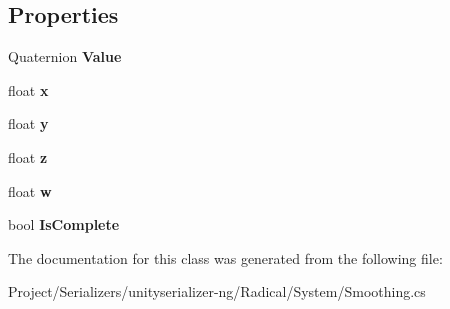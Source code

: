 \subsection*{Properties}
\begin{DoxyCompactItemize}
\item 
\mbox{\label{class_radical_library_1_1_smooth_quaternion_a9d3f043e67591ab5f423382e4c80e31a}} 
Quaternion {\bfseries Value}
\item 
\mbox{\label{class_radical_library_1_1_smooth_quaternion_a2a7bf0affc8ae6e1bdb86503f14ca72b}} 
float {\bfseries x}
\item 
\mbox{\label{class_radical_library_1_1_smooth_quaternion_a49802831b6ea1c84dcefe13469c5bac7}} 
float {\bfseries y}
\item 
\mbox{\label{class_radical_library_1_1_smooth_quaternion_ae2dabfebd2cf2b1bcc8050a004348185}} 
float {\bfseries z}
\item 
\mbox{\label{class_radical_library_1_1_smooth_quaternion_a3dc8ea0b5f162ce848b87677e3795433}} 
float {\bfseries w}
\item 
\mbox{\label{class_radical_library_1_1_smooth_quaternion_a9cfbac21089a16c9668e3ff0092b0adf}} 
bool {\bfseries Is\+Complete}
\end{DoxyCompactItemize}


The documentation for this class was generated from the following file\+:\begin{DoxyCompactItemize}
\item 
Project/\+Serializers/unityserializer-\/ng/\+Radical/\+System/Smoothing.\+cs\end{DoxyCompactItemize}
